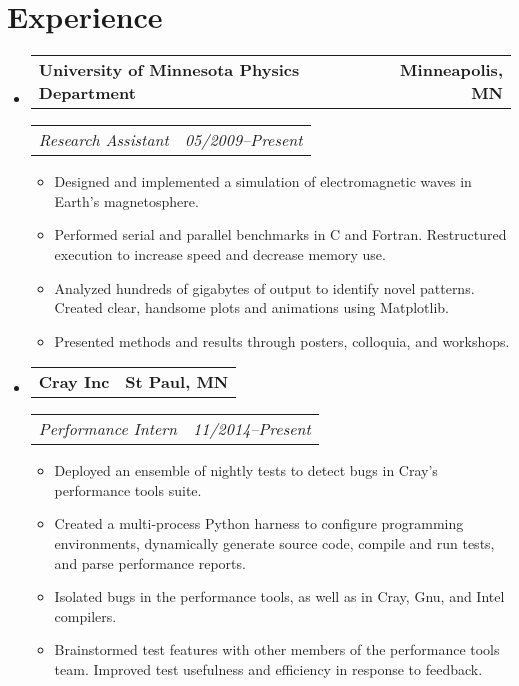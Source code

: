 \documentclass[11pt,letterpaper]{article}
\makeatletter
\newcommand{\headerrow}[2]{
  \begin{tabular*}{\linewidth}{l@{ \extracolsep{\fill} }r} #1 & #2 
  \end{tabular*}}
\newcommand{\YearRange}[2]{#1--#2}
\newcommand{\ResumeSection}[1]{
  \section*{ {\color{MidnightBlue}#1 \sout{\hfill} } } }
\newcommand{\CPP}{
  C\nolinebreak[4]\hspace{-.05em}\raisebox{.22ex}{\footnotesize\bf ++}\xspace}
\makeatother
\begin{document}

\ResumeSection{Experience}

\begin{itemize}[leftmargin=\parindent]
  \parskip=0.1em
  \itemsep=1.5em

  \item[]
    \headerrow{ \textbf{University of Minnesota Physics Department} }
              { \textbf{Minneapolis, MN} }
    \headerrow{ \emph{Research Assistant} }
              { \emph{ \YearRange{05/2009}{Present} } }
    \begin{itemize}
      \item Designed and implemented a simulation of electromagnetic waves in
            Earth's magnetosphere. 
      \item Performed serial and parallel benchmarks in \CPP and Fortran.
            Restructured execution to increase speed and decrease memory use. 
      \item Analyzed hundreds of gigabytes of output to identify novel 
            patterns. Created clear, handsome plots and animations using
            Matplotlib. 
      \item Presented methods and results through posters, colloquia, and
            workshops. 
    \end{itemize}

  \item[]
    \headerrow{ \textbf{Cray Inc} }{ \textbf{St Paul, MN} }
    \headerrow{ \emph{Performance Intern} }
              { \emph{ \YearRange{11/2014}{Present} } }
    \begin{itemize}
      \item Deployed an ensemble of nightly tests to detect bugs in Cray's 
            performance tools suite. 
      \item Created a multi-process Python harness to configure programming
            environments, dynamically generate source code, compile and run
            tests, and parse performance reports. 
      \item Isolated bugs in the performance tools, as well as in Cray, Gnu,
            and Intel compilers. 
      \item Brainstormed test features with other members of the performance
            tools team. Improved test usefulness and efficiency in response to
            feedback. 
    \end{itemize}


\end{itemize}
\end{document}
